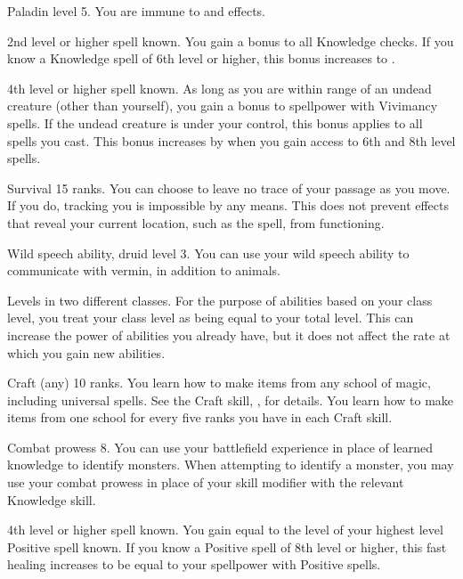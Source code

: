 \featpre Paladin level 5.
\featben You are immune to  and  effects.

\featpre 2nd level or higher  spell known.
\featben You gain a  bonus to all Knowledge checks.
If you know a Knowledge spell of 6th level or higher, this bonus increases to .

\featpre 4th level or higher  spell known.
\featben As long as you are within \rngclose range of an undead creature (other than yourself), you gain a  bonus to spellpower with Vivimancy spells.
If the undead creature is under your control, this bonus applies to all spells you cast.
This bonus increases by  when you gain access to 6th and 8th level spells.

\featpre Survival 15 ranks.
\featben You can choose to leave no trace of your passage as you move.
If you do, tracking you is impossible by any means.
This does not prevent effects that reveal your current location, such as the  spell, from functioning.

\featpre Wild speech ability, druid level 3.
\featben You can use your wild speech ability to communicate with vermin, in addition to animals.

\featpre Levels in two different classes.
\featben For the purpose of abilities based on your class level, you treat your class level as being equal to your total level.
This can increase the power of abilities you already have, but it does not affect the rate at which you gain new abilities.

\featpre Craft (any) 10 ranks.
\featben You learn how to make items from any school of magic, including universal spells.
See the Craft skill, , for details.
You learn how to make items from one school for every five ranks you have in each Craft skill.

\featpre Combat prowess 8.
\featben You can use your battlefield experience in place of learned knowledge to identify monsters.
When attempting to identify a monster, you may use your combat prowess in place of your skill modifier with the relevant Knowledge skill.

\featpre 4th level or higher  spell known.
\featben You gain  equal to the level of your highest level Positive spell known.
If you know a Positive spell of 8th level or higher, this fast healing increases to be equal to your spellpower with Positive spells.

